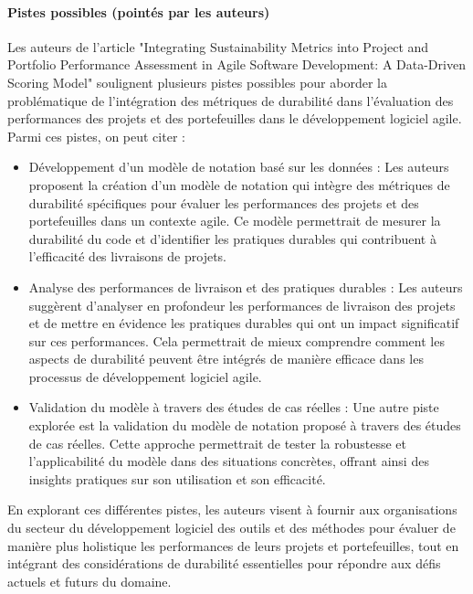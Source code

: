 \paragraph{Pistes possibles (pointés par les auteurs)}
Les auteurs de l'article "Integrating Sustainability Metrics into Project and Portfolio Performance Assessment in Agile Software Development: A Data-Driven Scoring Model" soulignent plusieurs pistes possibles pour aborder la problématique de l'intégration des métriques de durabilité dans l'évaluation des performances des projets et des portefeuilles dans le développement logiciel agile. Parmi ces pistes, on peut citer :
\begin{itemize}
    \item Développement d'un modèle de notation basé sur les données : Les auteurs proposent la création d'un modèle de notation qui intègre des métriques de durabilité spécifiques pour évaluer les performances des projets et des portefeuilles dans un contexte agile. Ce modèle permettrait de mesurer la durabilité du code et d'identifier les pratiques durables qui contribuent à l'efficacité des livraisons de projets.
    \item Analyse des performances de livraison et des pratiques durables : Les auteurs suggèrent d'analyser en profondeur les performances de livraison des projets et de mettre en évidence les pratiques durables qui ont un impact significatif sur ces performances. Cela permettrait de mieux comprendre comment les aspects de durabilité peuvent être intégrés de manière efficace dans les processus de développement logiciel agile.
    \item Validation du modèle à travers des études de cas réelles : Une autre piste explorée est la validation du modèle de notation proposé à travers des études de cas réelles. Cette approche permettrait de tester la robustesse et l'applicabilité du modèle dans des situations concrètes, offrant ainsi des insights pratiques sur son utilisation et son efficacité.
\end{itemize}
En explorant ces différentes pistes, les auteurs visent à fournir aux organisations du secteur du développement logiciel des outils et des méthodes pour évaluer de manière plus holistique les performances de leurs projets et portefeuilles, tout en intégrant des considérations de durabilité essentielles pour répondre aux défis actuels et futurs du domaine.

